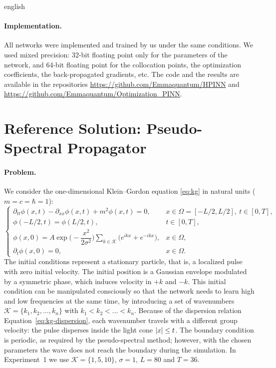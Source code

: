 \begin{hyphenrules}{english}
\paragraph{Implementation.}
All networks were implemented and trained by us under the same conditions. We used mixed precision:
32-bit floating point only for the parameters of the network, and 64-bit floating point for the
collocation points, the optimization coefficients, the back-propagated gradients, etc. The code and the
results are available in the repositories
\url{https://github.com/Emmaquantum/HPINN} and \url{https://github.com/Emmaquantum/Optimization_PINN}.

\section{Reference Solution: Pseudo-Spectral Propagator}\label{sec:reference-solution}

\paragraph{Problem.}
We consider the one-dimensional Klein--Gordon equation \eqref{eq:kg} in natural units ($m=c=\hbar=1$):
\begin{equation}
  \begin{cases}
    \partial_{tt}\phi(x,t)-\partial_{xx}\phi(x,t)+m^2\phi(x,t)=0, & x\in\Omega=[-L/2,L/2],\ t\in[0,T],\\
    \phi(-L/2,t)=\phi(L/2,t), & t\in[0,T],\\
    \phi(x,0)=A\exp\Big(-\dfrac{x^2}{2\sigma^2}\Big)\displaystyle\sum_{k\in\mathcal{K}}\big(e^{ikx}+e^{-ikx}\big), & x\in\Omega,\\
    \partial_t\phi(x,0)=0, & x\in\Omega.
  \end{cases}
  \label{eq:kg-problem}
\end{equation}
The initial conditions represent a stationary particle, that is, a localized pulse with zero initial
velocity. The initial position is a Gaussian envelope modulated by a symmetric phase, which induces
velocity in $+k$ and $-k$. This initial condition can be manipulated consciously so that the network
needs to learn high and low frequencies at the same time, by introducing a set of wavenumbers
$\mathcal{K}=\{k_1,k_2,\dots,k_n\}$ with $k_1<k_2<\dots<k_n$. Because of the dispersion relation
Equation~\eqref{eq:kg-dispersion}, each wavenumber travels with a different group velocity: the pulse disperses
inside the light cone $\left\lvert x \right\rvert\le t$. The boundary condition is periodic, as required by the
pseudo-spectral method; however, with the chosen parameters the wave does not reach the boundary during
the simulation. In Experiment~1 we use $\mathcal{K}=\{1,5,10\}$, $\sigma=1$, $L=80$ and $T=36$.


\end{hyphenrules}

